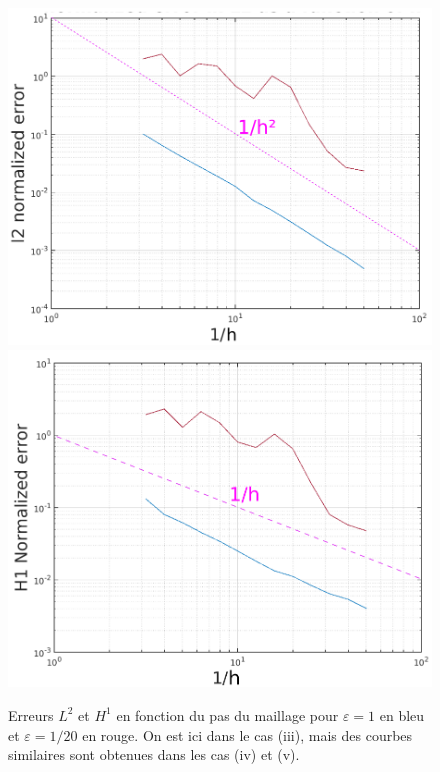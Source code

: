 \documentclass[11pt]{article}
\begin{document}
\begin{figure}
  \centering
  \includegraphics[height=.25\textheight]{SolutionExacte/err_L2} 
  \includegraphics[height=.25\textheight]{SolutionExacte/err_H1} 
  \caption{Erreurs $L^2$ et $H^1$ en fonction du pas du maillage pour $\varepsilon=1$ en bleu et  $\varepsilon=1/20$ en rouge. On est ici dans le cas
    (iii), mais des courbes similaires sont obtenues dans les cas (iv) et (v). }
  \label{fig:err_msh}
\end{figure}
\end{document}

